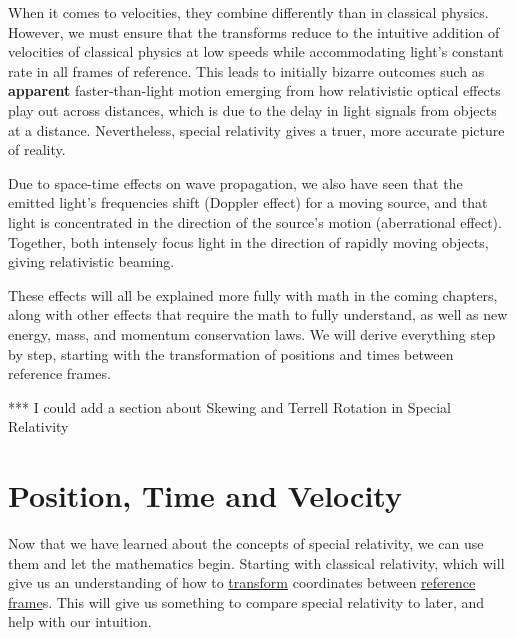 When it comes to velocities, they combine differently than in classical physics.
However, we must ensure that the transforms reduce to the intuitive addition of velocities of classical physics at low speeds while accommodating light's constant rate in all frames of reference.
This leads to initially bizarre outcomes such as \textbf{apparent} faster-than-light motion emerging from how relativistic optical effects play out across distances, which is due to the delay in light signals from objects at a distance.
Nevertheless, special relativity gives a truer, more accurate picture of reality.

Due to space-time effects on wave propagation, we also have seen that the emitted light's frequencies shift (Doppler effect) for a moving source, and that light is concentrated in the direction of the source's motion (aberrational effect).
Together, both intensely focus light in the direction of rapidly moving objects, giving relativistic beaming.

These effects will all be explained more fully with math in the coming chapters, along with other effects that require the math to fully understand, as well as new energy, mass, and momentum conservation laws.
We will derive everything step by step, starting with the transformation of positions and times between reference frames.



*** I could add a section about Skewing and Terrell Rotation in Special Relativity

\printbibliography[segment=\therefsegment, heading=subbibliography] %

\chapter{Position, Time and Velocity} \label{ch: Position, Time and Velocity} %

Now that we have learned about the concepts of special relativity, we can use them and let the mathematics begin.
Starting with classical relativity, which will give us an understanding of how to \hyperlink{def-transform}{transform} coordinates between \hyperlink{def-Reference-frame}{reference frame}s.
This will give us something to compare special relativity to later, and help with our intuition.

